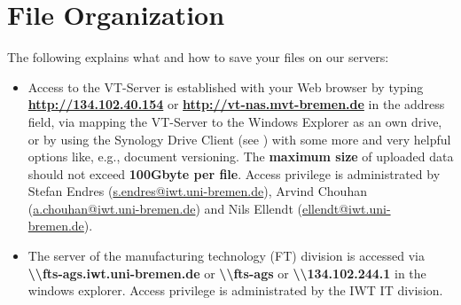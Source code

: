 \section{File Organization}
The following explains what and how to save your files on our servers:
\begin{itemize}
  \item Access to the VT-Server is established with your Web browser by typing
        \textbf{\url{http://134.102.40.154}} or
        \textbf{\url{http://vt-nas.mvt-bremen.de}}
        in the address field, via mapping the VT-Server to the Windows Explorer
        as an own drive, or by using the Synology Drive Client
        (see \cite{synology2022}) with some more and very helpful options like,
        e.g., document versioning. The \textbf{maximum size} of uploaded data
        should not exceed \textbf{100Gbyte per file}. Access privilege is
        administrated by
        Stefan Endres (\href{mailto:s.endres@iwt.uni-bremen.de}%
                       {s.endres@iwt.uni-bremen.de}),
        Arvind Chouhan (\href{mailto:a.chouhan@iwt.uni-bremen.de}%
                        {a.chouhan@iwt.uni-bremen.de})
        and Nils Ellendt (\href{mailto:ellendt@iwt.uni-bremen.de}%
                          {ellendt@iwt.uni-bremen.de}).
  \item The server of the manufacturing technology (FT) division is accessed via
        \textbf{\textbackslash\textbackslash fts-ags.iwt.uni-bremen.de}
        or \textbf{\textbackslash\textbackslash fts-ags}
        or \textbf{\textbackslash\textbackslash 134.102.244.1} in the
        windows explorer. Access privilege is administrated by the IWT IT
        division.
\end{itemize}

